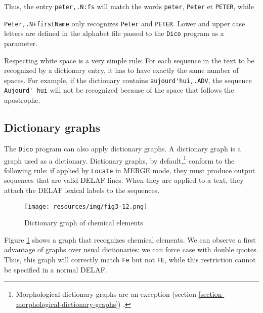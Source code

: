 \bigskip
\noindent Thus, the entry \verb$peter,.N:fs$ will match the words \verb+peter+,
\verb+Peter+ et \verb+PETER+, while

\noindent \verb$Peter,.N+firstName$ only 
recognizes \verb+Peter+ and \verb+PETER+. Lower and upper case
letters are defined in the alphabet file passed to the \verb+Dico+ program
as a parameter.

\bigskip
\noindent Respecting white space is a very simple rule: For each sequence in the text to be
recognized by a dictionary entry, it has to have exactly the same number of
spaces. For example, if the dictionary contains \verb+aujourd'hui,.ADV+, the
sequence \verb+Aujourd' hui+ will not be recognized because of the space that
follows the apostrophe.


\subsection{Dictionary graphs}
\label{section-dictionary-graphs}
The \verb+Dico+ program
can also apply dictionary graphs.
A dictionary graph is a graph used as a dictionary.
Dictionary graphs,
by default,\footnote{Morphological dictionary-graphs are an exception (section
\ref{section-morphological-dictionary-graphs}) .}
conform to the following rule: if applied by \verb+Locate+ in MERGE mode,
they must produce output sequences that are valid DELAF lines.
When they are applied to a text, they attach the DELAF lexical labels to the sequences.

\begin{figure}[!p]
\begin{center}
\texttt{[image: resources/img/fig3-12.png]}
\caption{Dictionary graph of chemical elements\label{elements}}
\end{center}
\end{figure}

\bigskip
\noindent Figure \ref{elements} shows a graph that recognizes chemical
elements. We can observe a first advantage of graphs over usual dictionaries: we can force case
with double quotes. Thus, this graph will
correctly match \verb+Fe+ but not \verb+FE+, while this restriction cannot be specified in a
normal DELAF.

